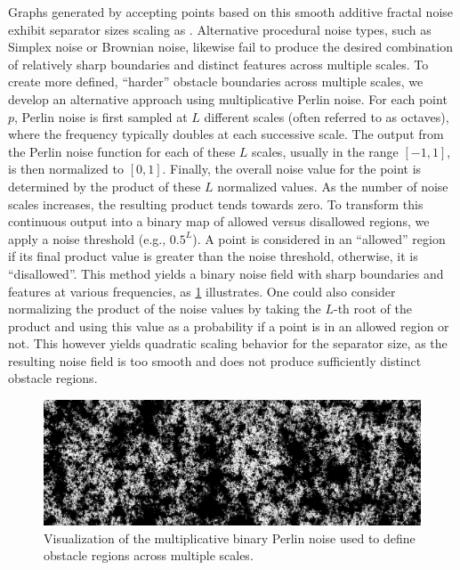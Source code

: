Graphs generated by accepting points based on this smooth additive fractal noise exhibit separator sizes scaling as .
Alternative procedural noise types, such as Simplex noise or Brownian noise, likewise fail to produce the desired combination of relatively sharp boundaries and distinct features across multiple scales.
To create more defined, \enquote{harder} obstacle boundaries across multiple scales, we develop an alternative approach using multiplicative Perlin noise.
For each point \(p\), Perlin noise is first sampled at \(L\) different scales (often referred to as octaves), where the frequency typically doubles at each successive scale.
The output from the Perlin noise function for each of these \(L\) scales, usually in the range \([-1, 1]\), is then normalized to \([0, 1]\).
Finally, the overall noise value for the point is determined by the product of these \(L\) normalized values.
As the number of noise scales increases, the resulting product tends towards zero.
To transform this continuous output into a binary map of allowed versus disallowed regions, we apply a noise threshold (e.g., \(0.5^L\)).
A point is considered in an \enquote{allowed} region if its final product value is greater than the noise threshold,
otherwise, it is \enquote{disallowed}.
This method yields a binary noise field with sharp boundaries and features at various frequencies, as \cref{fig:multiplicative_binary_noise_viz} illustrates.
One could also consider normalizing the product of the noise values by taking the \(L\)-th root of the product and using this value as a probability if a point is in an allowed region or not.
This however yields quadratic scaling behavior for the separator size, as the resulting noise field is too smooth and does not produce sufficiently distinct obstacle regions.

\begin{figure}[tbhp]
	\centering
	\includegraphics[width=\linewidth]{graphics/noise_image.png}
	\caption{Visualization of the multiplicative binary Perlin noise used to define obstacle regions across multiple scales.}
	\label{fig:multiplicative_binary_noise_viz}
\end{figure}

